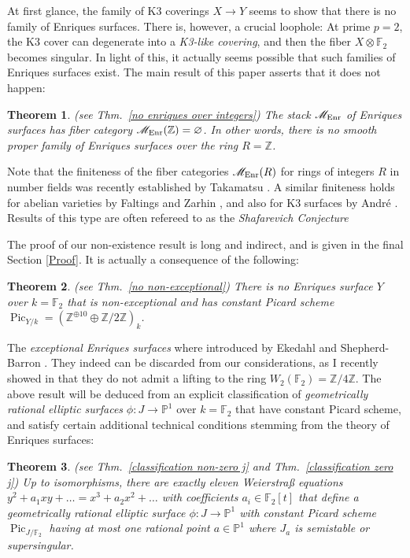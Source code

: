 \documentclass[oneside, 12pt]{amsart}
\newtheorem*{maintheorem}{Theorem}
\theoremstyle{definition}
\theoremstyle{remark}
\newcommand{\ZZ}{\mathbb{Z}}
\newcommand{\FF}{\mathbb{F}}
\newcommand{\PP}{\mathbb{P}}
\newcommand{\shM}{\mathscr{M}}
\newcommand{\Pic}{\operatorname{Pic}}
\newcommand{\ra}{\rightarrow}
\newcommand{\Enr}{{\text{\rm Enr}}}
\begin{document}
At first glance, the family of  K3 coverings $X\ra Y$ seems to show that there is no   family of Enriques surfaces.
There is, however, a  crucial loophole: At prime $p=2$, the K3 cover can degenerate into a \emph{K3-like covering}, and then
the fiber $X\otimes\FF_2$ becomes singular. In light of this, it actually seems    possible that
such families of Enriques surfaces exist. The main result of this paper asserts that it does not happen:

\begin{maintheorem}
{\rm (see Thm.\ \ref{no enriques over integers})}
The   stack $\shM_\Enr$ of Enriques surfaces
has fiber category $\shM_\Enr(\ZZ)=\varnothing$. In other words, 
there is no smooth proper family  of Enriques surfaces over the ring $R=\ZZ$. 
\end{maintheorem}

Note that the finiteness of the fiber categories $\shM_\Enr(R)$ for rings of integers $R$ in   number fields  was recently
established by Takamatsu \cite{Takamatsu 2019}. A similar finiteness holds for abelian varieties
by Faltings \cite{Faltings 1983} and Zarhin \cite{Zarhin 1985}, and also for K3 surfaces by Andr\'e \cite{Andre 1996}.
Results of this type are often refereed to as the \emph{Shafarevich Conjecture} \cite{Shafarevich 1963}

The proof of our non-existence result is long and indirect, and is given in the final Section \ref{Proof}.
It is actually a  consequence of the following:

\begin{maintheorem}
{\rm (see Thm.\ \ref{no non-exceptional})}
There is no Enriques surface $Y$ over   $k=\FF_2$  that is non-exceptional and has
constant Picard scheme $\Pic_{Y/k}=(\ZZ^{\oplus 10}\oplus\ZZ/2\ZZ)_k$.
\end{maintheorem}

The  \emph{exceptional Enriques surfaces} where introduced by Ekedahl and Shepherd-Barron \cite{Ekedahl; Shepherd-Barron 2004}.
They indeed can be discarded from our considerations, as I recently showed in \cite{Schroeer 2021b} that they do not admit a lifting
to the ring $W_2(\FF_2)=\ZZ/4\ZZ$.
The above result will be deduced from an explicit classification of \emph{geometrically rational elliptic surfaces} $\phi:J\ra\PP^1$
over $k=\FF_2$ that have constant Picard scheme, and satisfy 
certain additional technical conditions stemming from the theory of Enriques surfaces:

\begin{maintheorem}
{\rm (see Thm.\ \ref{classification non-zero j} and Thm.\ \ref{classification zero j})}
Up to isomorphisms, there are exactly eleven Weierstra\ss{}
equations $y^2+a_1xy + \ldots =x^3+a_2x^2+\ldots$ with coefficients $a_i\in \FF_2[t]$
that define a geometrically rational elliptic surface $\phi:J\ra\PP^1$  
with constant Picard scheme $\Pic_{J/\FF_2}$  having at most one rational point $a\in \PP^1$ where $J_a$ is semistable or supersingular.
\end{maintheorem}
\end{document}
